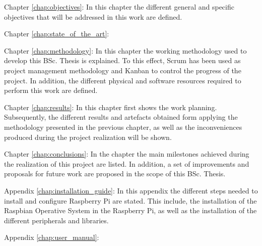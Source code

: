 \begin{definitionlist}
	\item[Chapter \ref{chap:objectives}: \nameref{chap:objectives}] In this chapter the different general and specific objectives that will be addressed in this work are defined.
	
	\item[Chapter \ref{chap:state_of_the_art}: \nameref{chap:state_of_the_art}] 
	
	\item[Chapter \ref{chap:methodology}: \nameref{chap:methodology}] In this chapter the working methodology used to develop this \ac{BSc.} Thesis is explained. To this effect, Scrum has been used as project management methodology and Kanban to control the progress of the project. In addition, the different physical and software resources required to perform this work are defined.
	
	\item[Chapter \ref{chap:results}: \nameref{chap:results}] In this chapter first shows the work planning. Subsequently, the different results and artefacts obtained form applying the methodology presented in the previous chapter, as well as the inconveniences produced during the project realization will be shown. 
	
	\item[Chapter \ref{chap:conclusions}: \nameref{chap:conclusions}] In the chapter the main milestones achieved during the realization of this project are listed. In addition, a set of improvements and proposals for future work are proposed in the scope of this \ac{BSc.} Thesis. 
	
	\item[Appendix \ref{chap:installation_guide}: \nameref{chap:installation_guide}] In this appendix the different steps needed to install and configure Raspberry Pi are stated. This include, the installation of the Raspbian Operative System in the Raspberry Pi, as well as the installation of the different peripherals and libraries.
	
	\item[Appendix \ref{chap:user_manual}: \nameref{chap:user_manual}] 
\end{definitionlist}
